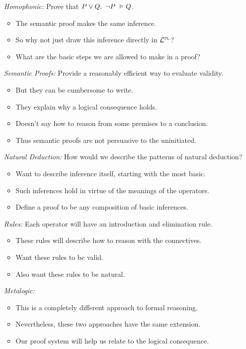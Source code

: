 \documentclass[a4paper, 11pt]{article} %
\begin{document}
\begin{enumerate}
  \item[\it Homophonic:] Prove that $P \vee Q,\ \neg P\ \vDash Q$. 
    \begin{itemize}
      \item The semantic proof makes the same inference.
      \item So why not just draw this inference directly in $\mathcal{L}^{\textsc{pl}}$?
      \item What are the basic steps we are allowed to make in a proof?
    \end{itemize}
  \item[\it Semantic Proofs:] Provide a reasonably efficient way to evaluate validity.
    \begin{itemize}
      \item But they can be cumbersome to write.
      \item They explain why a logical consequence holds.
      \item Doesn't say how to reason from some premises to a conclusion.
      \item Thus semantic proofs are not persuasive to the uninitiated.
    \end{itemize}
  \item[\it Natural Deduction:] How would we describe the patterns of natural deduction?
    \begin{itemize}
      \item Want to describe inference itself, starting with the most basic.
      \item Such inferences hold in virtue of the meanings of the operators.
      \item Define a proof to be any composition of basic inferences.
    \end{itemize}
  \item[\it Rules:] Each operator will have an introduction and elimination rule.
    \begin{itemize}
      \item These rules will describe how to reason with the connectives.
      \item Want these rules to be valid.
      \item Also want these rules to be natural.
    \end{itemize}
  \item[\it Metalogic:] 
    \begin{itemize}
      \item This is a completely different approach to formal reasoning.
      \item Nevertheless, these two approaches have the same extension.
      \item Our proof system will help us relate to the logical consequence.
    \end{itemize}
\end{enumerate}
\end{document}
